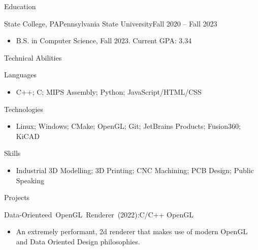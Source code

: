 \documentclass[]{cv}
\begin{document}
	
	\makeheader
	
	\begin{cvsection}{Education}
		\begin{cvsubsection}{State College, PA}{Pennsylvania State University}{Fall 2020 -- Fall 2023}
			\begin{itemize}
				\item B.S. in Computer Science, Fall 2023.   \hfill Current GPA: 3.34
			\end{itemize}
		\end{cvsubsection}
	\end{cvsection}

	\begin{cvsection}{Technical Abilities}
		\begin{cvsubsection}{Languages}{}{}	
			\begin{itemize}
				\item C++; C; MIPS Assembly; Python; JavaScript/HTML/CSS
			\end{itemize}
		\end{cvsubsection}
		\begin{cvsubsection}{Technologies}{}{}	
			\begin{itemize}
				\item Linux; Windows; CMake; OpenGL; Git; JetBrains Products; Fusion360; KiCAD
			\end{itemize}
		\end{cvsubsection}
		\begin{cvsubsection}{Skills}{}{}	
			\begin{itemize}
				\item Industrial 3D Modelling; 3D Printing; CNC Machining; PCB Design; Public Speaking
			\end{itemize}
		\end{cvsubsection}
	\end{cvsection}

	\begin{cvsection}{Projects}
		\begin{cvsubsection}{\mbox{Data-Orienteed OpenGL Renderer (2022):}}{}{C/C++ OpenGL}
			\begin{itemize}
				\item  An extremely performant, 2d renderer that makes use of modern OpenGL and Data Oriented Design philosophies.
			\end{itemize}
		\end{cvsubsection}
	\end{cvsection}
	
\end{document}
